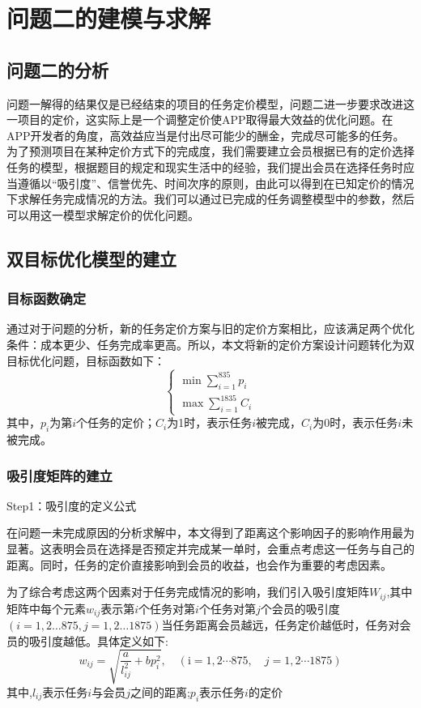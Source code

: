 \section{问题二的建模与求解}
\subsection{问题二的分析}
问题一解得的结果仅是已经结束的项目的任务定价模型，问题二进一步要求改进这一项目的定价，这实际上是一个调整定价使APP取得最大效益的优化问题。在APP开发者的角度，高效益应当是付出尽可能少的酬金，完成尽可能多的任务。为了预测项目在某种定价方式下的完成度，我们需要建立会员根据已有的定价选择任务的模型，根据题目的规定和现实生活中的经验，我们提出会员在选择任务时应当遵循以“吸引度”、信誉优先、时间次序的原则，由此可以得到在已知定价的情况下求解任务完成情况的方法。我们可以通过已完成的任务调整模型中的参数，然后可以用这一模型求解定价的优化问题。
\subsection{双目标优化模型的建立}
\subsubsection{目标函数确定}
通过对于问题的分析，新的任务定价方案与旧的定价方案相比，应该满足两个优化条件：成本更少、任务完成率更高。所以，本文将新的定价方案设计问题转化为双目标优化问题，目标函数如下：$$\left\{\begin{array}{l}
        \min \sum_{i=1}^{835} p_{i} \\
        \max \sum_{i=1}^{1835} C_{i}
    \end{array}\right.$$
其中，$p_i$为第$i$个任务的定价；$C_i$为1时，表示任务$i$被完成，$C_i$为0时，表示任务$i$未被完成。
\subsubsection{吸引度矩阵的建立}
Step1：吸引度的定义公式

在问题一未完成原因的分析求解中，本文得到了距离这个影响因子的影响作用最为显著。这表明会员在选择是否预定并完成某一单时，会重点考虑这一任务与自己的距离。同时，任务的定价直接影响到会员的收益，也会作为重要的考虑因素。

为了综合考虑这两个因素对于任务完成情况的影响，我们引入吸引度矩阵$W_{ij}$,其中矩阵中每个元素$w_{ij}$表示第$i$个任务对第$i$个任务对第$j$个会员的吸引度$(i=1,2\ldots 875,j=1,2\ldots 1875)$当任务距离会员越远，任务定价越低时，任务对会员的吸引度越低。具体定义如下:
$$w_{i j}=\sqrt{\frac{a}{l_{i j}^{2}}+b p_{i}^{2}}, \quad(\mathrm{i}=1,2 \cdots 875, \quad j=1,2 \cdots 1875)$$
其中,$l_{ij}$表示任务$i$与会员$j$之间的距离;$p_i$表示任务$i$的定价

